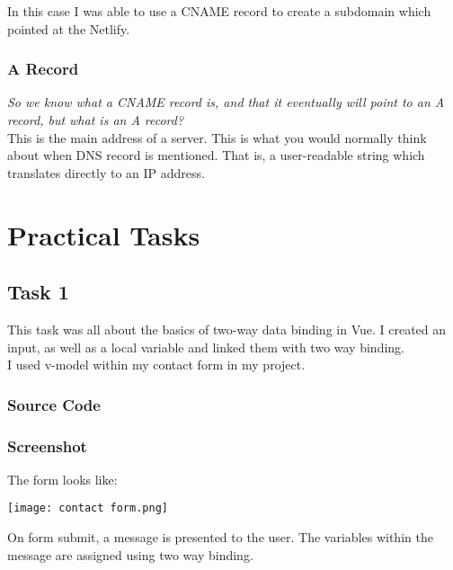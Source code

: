 \documentclass[portfolio.tex]{subfiles}
\begin{document}
	 			In this case I was able to use a CNAME record to create a subdomain which pointed at the Netlify. \autocite{cloudflare-CNAME}

	 		\subsubsection{A Record}
	 			\textit{So we know what a CNAME record is, and that it eventually will point to an A record, but what is an A record?}\\

	 			This is the main address of a server. This is what you would normally think about when DNS record is mentioned. That is, a user-readable string which translates directly to an IP address.  \autocite{cloudflare-A}



	\section{Practical Tasks}
		\subsection{Task 1}
			This task was all about the basics of two-way data binding in Vue. I created an input, as well as a local variable and linked them with two way binding.\\

			I used v-model within my contact form in my project.

			\subsubsection{Source Code}

			\subsubsection{Screenshot}
				The form looks like:

				\begin{center}
					\texttt{[image: contact form.png]}
				\end{center}

				On form submit, a message is presented to the user. The variables within the message are assigned using two way binding.
\end{document}
